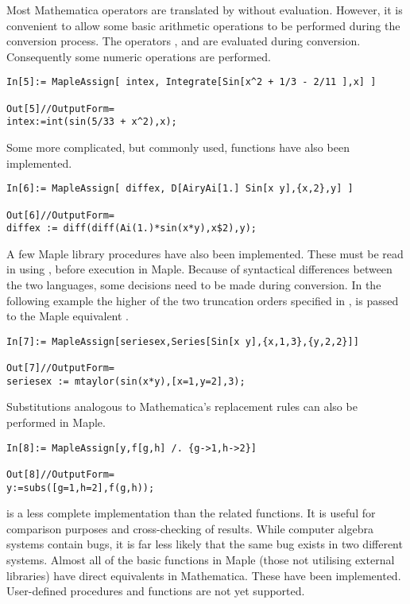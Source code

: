 \documentclass [12pt,twoside]{article}
\begin{document}
Most Mathematica operators are translated by  without evaluation.
However, it is convenient to allow some basic arithmetic operations to be performed
during the conversion process. The operators ,  and 
are evaluated during conversion. Consequently some numeric operations are performed.

\begin{verbatim}
In[5]:= MapleAssign[ intex, Integrate[Sin[x^2 + 1/3 - 2/11 ],x] ]

Out[5]//OutputForm=
intex:=int(sin(5/33 + x^2),x);
\end{verbatim}
Some more complicated, but commonly used, functions have also been implemented.

\begin{verbatim}
In[6]:= MapleAssign[ diffex, D[AiryAi[1.] Sin[x y],{x,2},y] ]

Out[6]//OutputForm=
diffex := diff(diff(Ai(1.)*sin(x*y),x$2),y);
\end{verbatim}
A few Maple library procedures have also been implemented. These must be read in
using , before execution in Maple. Because of syntactical
differences between the two languages, some decisions need to be made during
conversion. In the following example the higher of the two truncation orders
specified in , is passed to the Maple equivalent .

\begin{verbatim}
In[7]:= MapleAssign[seriesex,Series[Sin[x y],{x,1,3},{y,2,2}]]

Out[7]//OutputForm=
seriesex := mtaylor(sin(x*y),[x=1,y=2],3);
\end{verbatim}
Substitutions analogous to Mathematica's replacement rules can also be performed
in Maple.

\begin{verbatim}
In[8]:= MapleAssign[y,f[g,h] /. {g->1,h->2}]

Out[8]//OutputForm=
y:=subs([g=1,h=2],f(g,h));
\end{verbatim}
 is a less complete implementation than the related 
functions. It is useful for comparison purposes and cross-checking of results.
While computer algebra systems contain bugs, it is far less likely that the same bug
exists in two different systems. Almost all of the basic functions in Maple (those
not utilising external libraries) have direct equivalents in Mathematica.
These have been implemented. User-defined procedures and functions are not yet
supported.
\end{document}
